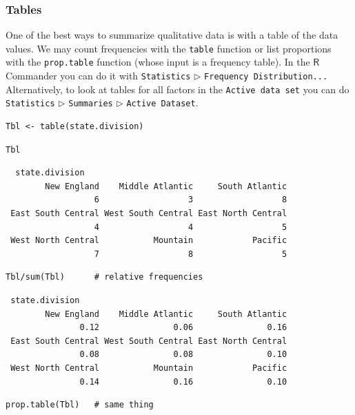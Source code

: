 \documentclass[captions=tableheading]{scrbook}
\begin{document}
\subsubsection{Tables}
\label{sec-2-1-4-1}
\label{par:Tables}


One of the best ways to summarize qualitative data is with a table of the data values. We may count frequencies with the \texttt{table} function or list proportions with the \texttt{prop.table} function (whose input is a frequency table). In the \(\mathsf{R}\) Commander you can do it with \texttt{Statistics} \(\triangleright\) \texttt{Frequency Distribution...} Alternatively, to look at tables for all factors in the \texttt{Active data set} you can do \texttt{Statistics} \(\triangleright\) \texttt{Summaries} \(\triangleright\) \texttt{Active Dataset}.


\begin{verbatim}
Tbl <- table(state.division)
\end{verbatim}


\begin{verbatim}
Tbl
\end{verbatim}

\begin{verbatim}
  state.division
        New England    Middle Atlantic     South Atlantic 
                  6                  3                  8 
 East South Central West South Central East North Central 
                  4                  4                  5 
 West North Central           Mountain            Pacific 
                  7                  8                  5
\end{verbatim}


\begin{verbatim}
Tbl/sum(Tbl)      # relative frequencies
\end{verbatim}

\begin{verbatim}
 state.division
        New England    Middle Atlantic     South Atlantic 
               0.12               0.06               0.16 
 East South Central West South Central East North Central 
               0.08               0.08               0.10 
 West North Central           Mountain            Pacific 
               0.14               0.16               0.10
\end{verbatim}


\begin{verbatim}
prop.table(Tbl)   # same thing
\end{verbatim}
\end{document}
